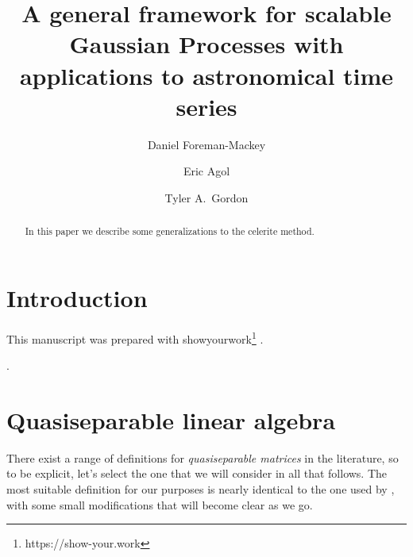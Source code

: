 \documentclass[modern]{aastex631}
\newcommand{\project}[1]{\textsf{#1}}
\begin{document}
\title{A general framework for scalable Gaussian Processes with applications to astronomical time series}

\author[0000-0002-9328-5652]{Daniel Foreman-Mackey}

\author[0000-0002-0802-9145]{Eric Agol}

\author[0000-0001-5253-1987]{Tyler A.\ Gordon}

\begin{abstract}
    In this paper we describe some generalizations to the \project{celerite} method.
\end{abstract}


\section{Introduction}
\label{sec:intro}

This manuscript was prepared with \project{showyourwork}\footnote{https://show-your.work} \citep{Luger:2021}.

\citep{Foreman-Mackey:2017, Foreman-Mackey:2018, Foreman-Mackey:2021}.

\section{Quasiseparable linear algebra}

There exist a range of definitions for \emph{quasiseparable matrices} in the literature, so to be explicit, let's select the one that we will consider in all that follows.
The most suitable definition for our purposes is nearly identical to the one used by \citet{Eidelman:1999}, with some small modifications that will become clear as we go.
\end{document}
